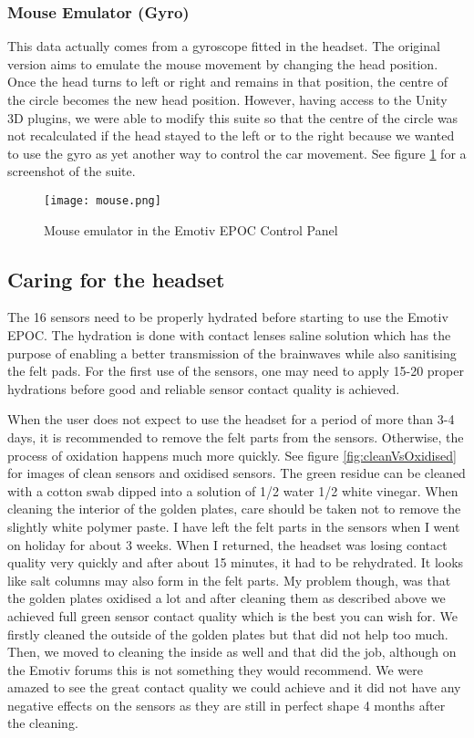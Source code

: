 \subsubsection{Mouse Emulator (Gyro)}

This data actually comes from a gyroscope fitted in the headset. The original version aims to emulate the mouse movement by changing the head position. Once the head turns to left or right and remains in that position, the centre of the circle becomes the new head position. However, having access to the Unity 3D plugins, we were able to modify this suite so that the centre of the circle was not recalculated if the head stayed to the left or to the right because we wanted to use the gyro as yet another way to control the car movement. See figure \ref{fig:gyro} for a screenshot of the suite.

\begin{figure}
  \centering
  \texttt{[image: mouse.png]}
  \caption{Mouse emulator in the Emotiv EPOC Control Panel}
    \label{fig:gyro}           
\end{figure}

\subsection{Caring for the headset}
The 16 sensors need to be properly hydrated before starting to use the Emotiv EPOC. The hydration is done with contact lenses saline solution which has the purpose of enabling a better transmission of the brainwaves while also sanitising the felt pads. For the first use of the sensors, one may need to apply 15-20 proper hydrations before good and reliable sensor contact quality is achieved.

When the user does not expect to use the headset for a period of more than 3-4 days, it is recommended to remove the felt parts from the sensors. Otherwise, the process of oxidation happens much more quickly. See figure \ref{fig:cleanVsOxidised} for images of clean sensors and oxidised sensors. The green residue can be cleaned with a cotton swab dipped into a solution of 1/2 water 1/2 white vinegar. When cleaning the interior of the golden plates, care should be taken not to remove the slightly white polymer paste. I have left the felt parts in the sensors when I went on holiday for about 3 weeks. When I returned, the headset was losing contact quality very quickly and after about 15 minutes, it had to be rehydrated. It looks like salt columns may also form in the felt parts. My problem though, was that the golden plates oxidised a lot and after cleaning them as described above we achieved full green sensor contact quality which is the best you can wish for. We firstly cleaned the outside of the golden plates but that did not help too much. Then, we moved to cleaning the inside as well and that did the job, although on the Emotiv forums this is not something they would recommend. We were amazed to see the great contact quality we could achieve and it did not have any negative effects on the sensors as they are still in perfect shape 4 months after the cleaning.

